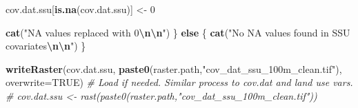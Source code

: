 \documentclass[
  10pt,
  b5paper,
  oneside]{book}
\newenvironment{Shaded}{\begin{snugshade}}{\end{snugshade}}
\newcommand{\AttributeTok}[1]{\textcolor[rgb]{0.13,0.29,0.53}{#1}}
\newcommand{\CommentTok}[1]{\textcolor[rgb]{0.56,0.35,0.01}{\textit{#1}}}
\newcommand{\ConstantTok}[1]{\textcolor[rgb]{0.56,0.35,0.01}{#1}}
\newcommand{\ControlFlowTok}[1]{\textcolor[rgb]{0.13,0.29,0.53}{\textbf{#1}}}
\newcommand{\DecValTok}[1]{\textcolor[rgb]{0.00,0.00,0.81}{#1}}
\newcommand{\FunctionTok}[1]{\textcolor[rgb]{0.13,0.29,0.53}{\textbf{#1}}}
\newcommand{\NormalTok}[1]{#1}
\newcommand{\OtherTok}[1]{\textcolor[rgb]{0.56,0.35,0.01}{#1}}
\newcommand{\SpecialCharTok}[1]{\textcolor[rgb]{0.81,0.36,0.00}{\textbf{#1}}}
\newcommand{\StringTok}[1]{\textcolor[rgb]{0.31,0.60,0.02}{#1}}
\begin{document}
\begin{Shaded}
\begin{Highlighting}[]
\NormalTok{  cov.dat.ssu[}\FunctionTok{is.na}\NormalTok{(cov.dat.ssu)] }\OtherTok{\textless{}{-}} \DecValTok{0}
  
  \FunctionTok{cat}\NormalTok{(}\StringTok{"NA values replaced with 0}\SpecialCharTok{\textbackslash{}n\textbackslash{}n}\StringTok{"}\NormalTok{)}
\NormalTok{\} }\ControlFlowTok{else}\NormalTok{ \{}
  \FunctionTok{cat}\NormalTok{(}\StringTok{"No NA values found in SSU covariates}\SpecialCharTok{\textbackslash{}n\textbackslash{}n}\StringTok{"}\NormalTok{)}
\NormalTok{\}}

\FunctionTok{writeRaster}\NormalTok{(cov.dat.ssu, }\FunctionTok{paste0}\NormalTok{(raster.path,}\StringTok{"cov\_dat\_ssu\_100m\_clean.tif"}\NormalTok{), }\AttributeTok{overwrite=}\ConstantTok{TRUE}\NormalTok{)}
\CommentTok{\# Load if needed. Similar process to cov.dat and land use vars.}
\CommentTok{\# cov.dat.ssu \textless{}{-} rast(paste0(raster.path,"cov\_dat\_ssu\_100m\_clean.tif"))}
\end{Highlighting}
\end{Shaded}
\end{document}
